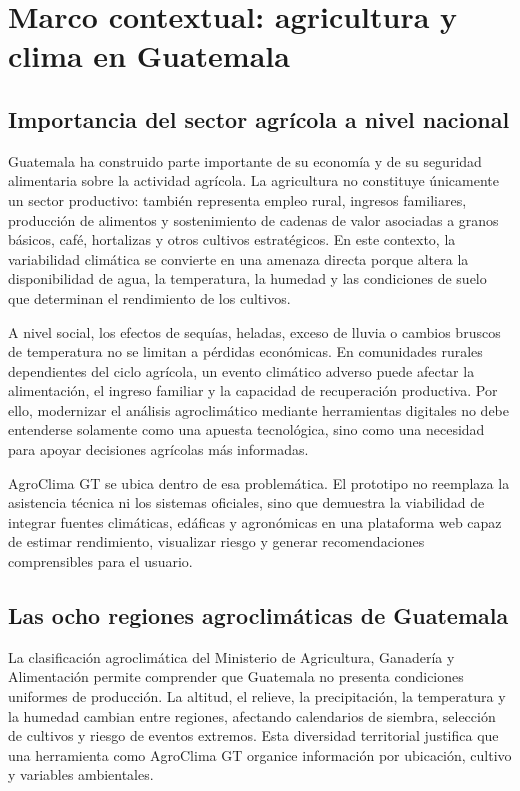 \documentclass[12pt,letterpaper,oneside]{report}
\begin{document}

\chapter{Marco contextual: agricultura y clima en Guatemala}

\section{Importancia del sector agrícola a nivel nacional}
Guatemala ha construido parte importante de su economía y de su seguridad alimentaria sobre la actividad agrícola. La agricultura no constituye únicamente un sector productivo: también representa empleo rural, ingresos familiares, producción de alimentos y sostenimiento de cadenas de valor asociadas a granos básicos, café, hortalizas y otros cultivos estratégicos. En este contexto, la variabilidad climática se convierte en una amenaza directa porque altera la disponibilidad de agua, la temperatura, la humedad y las condiciones de suelo que determinan el rendimiento de los cultivos.

A nivel social, los efectos de sequías, heladas, exceso de lluvia o cambios bruscos de temperatura no se limitan a pérdidas económicas. En comunidades rurales dependientes del ciclo agrícola, un evento climático adverso puede afectar la alimentación, el ingreso familiar y la capacidad de recuperación productiva. Por ello, modernizar el análisis agroclimático mediante herramientas digitales no debe entenderse solamente como una apuesta tecnológica, sino como una necesidad para apoyar decisiones agrícolas más informadas.

AgroClima GT se ubica dentro de esa problemática. El prototipo no reemplaza la asistencia técnica ni los sistemas oficiales, sino que demuestra la viabilidad de integrar fuentes climáticas, edáficas y agronómicas en una plataforma web capaz de estimar rendimiento, visualizar riesgo y generar recomendaciones comprensibles para el usuario.

\section{Las ocho regiones agroclimáticas de Guatemala}
La clasificación agroclimática del Ministerio de Agricultura, Ganadería y Alimentación permite comprender que Guatemala no presenta condiciones uniformes de producción. La altitud, el relieve, la precipitación, la temperatura y la humedad cambian entre regiones, afectando calendarios de siembra, selección de cultivos y riesgo de eventos extremos. Esta diversidad territorial justifica que una herramienta como AgroClima GT organice información por ubicación, cultivo y variables ambientales.
\end{document}
